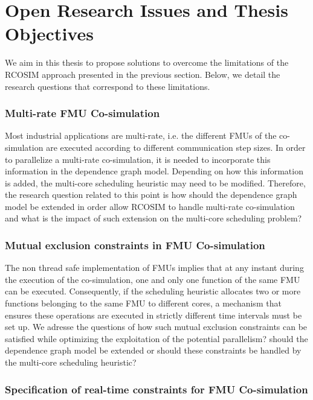 \section{Open Research Issues and Thesis Objectives}

We aim in this thesis to propose solutions to overcome the limitations of the RCOSIM approach presented in the previous section. Below, we detail the research questions that correspond to these limitations.

\subsubsection{Multi-rate FMU Co-simulation}

Most industrial applications are multi-rate, i.e. the different FMUs of the co-simulation are executed according to different communication step sizes. In order to parallelize a multi-rate co-simulation, it is needed to incorporate this information in the dependence graph model. Depending on how this information is added, the multi-core scheduling heuristic may need to be modified. Therefore, the research question related to this point is how should the dependence graph model be extended in order allow RCOSIM to handle multi-rate co-simulation and what is the impact of such extension on the multi-core scheduling problem?

\subsubsection{Mutual exclusion constraints in FMU Co-simulation}

The non thread safe implementation of FMUs implies that at any instant during the execution of the co-simulation, one and only one function of the same FMU can be executed. Consequently, if the scheduling heuristic allocates two or more functions belonging to the same FMU to different cores, a mechanism that ensures these operations are executed in strictly different time intervals must be set up. We adresse the questions of how such mutual exclusion constraints can be satisfied while optimizing the exploitation of the potential parallelism? should the dependence graph model be extended or should these constraints be handled by the multi-core scheduling heuristic?

\subsubsection{Specification of real-time constraints for FMU Co-simulation}

